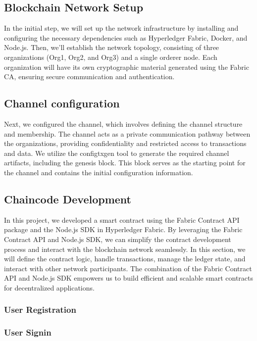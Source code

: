 \subsection{Blockchain Network Setup}
\noindent In the initial step, we will set up the network infrastructure by installing and configuring the necessary dependencies such as Hyperledger Fabric, Docker, and Node.js. Then, we'll establish the network topology, consisting of three organizations (Org1, Org2, and Org3) and a single orderer node. Each organization will have its own cryptographic material generated using the Fabric CA, ensuring secure communication and authentication. 
\subsection{Channel configuration}
\noindent Next, we configured the channel, which involves defining the channel structure and membership. The channel acts as a private communication pathway between the organizations, providing confidentiality and restricted access to transactions and data. We utilize the configtxgen tool to generate the required channel artifacts, including the genesis block. This block serves as the starting point for the channel and contains the initial configuration information.

\subsection{Chaincode Development}
\noindent In this project, we developed a smart 
contract using the Fabric Contract API package and the Node.js SDK in Hyperledger Fabric. By leveraging the Fabric Contract API and Node.js SDK, we can simplify the contract development process and interact with the blockchain network seamlessly. In this section, we will define the contract logic, handle transactions, manage the ledger state, and interact with other network participants. The combination of the Fabric Contract API and Node.js SDK empowers us to build efficient and scalable smart contracts for decentralized applications.
\subsubsection{User Registration}

\subsubsection{User Signin}

